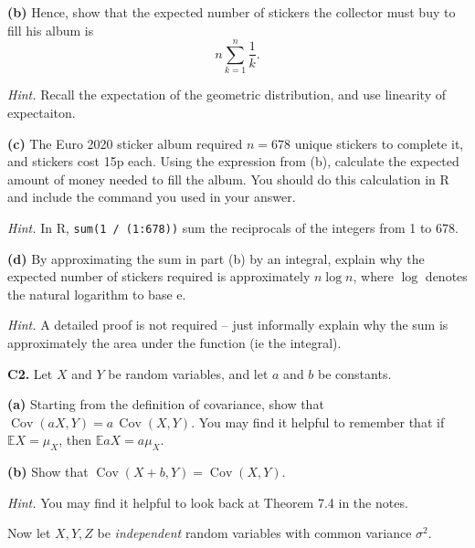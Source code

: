 \documentclass[
  a4paper,
]{book}
\theoremstyle{definition}
\theoremstyle{definition}
\theoremstyle{definition}
\theoremstyle{definition}
\theoremstyle{remark}
\begin{document}
\textbf{(b)} Hence, show that the expected number of stickers the collector must buy to fill his album is
\[ n \sum_{k=1}^n \frac{1}{k} . \]

\begin{myanswers}
\emph{Hint.} Recall the expectation of the geometric distribution, and use linearity of expectaiton.

\end{myanswers}

\textbf{(c)} The Euro 2020 sticker album required \(n = 678\) unique stickers to complete it, and stickers cost 15p each. Using the expression from (b), calculate the expected amount of money needed to fill the album. You should do this calculation in R and include the command you used in your answer.

\begin{myanswers}
\emph{Hint.} In R, \texttt{sum(1\ /\ (1:678))} sum the reciprocals of the integers from 1 to 678.

\end{myanswers}

\textbf{(d)} By approximating the sum in part (b) by an integral, explain why the expected number of stickers required is approximately \(n \log n\), where \(\log\) denotes the natural logarithm to base \(\mathrm e\).

\begin{myanswers}
\emph{Hint.} A detailed proof is not required -- just informally explain why the sum is approximately the area under the function (ie the integral).

\end{myanswers}

\textbf{C2.} Let \(X\) and \(Y\) be random variables, and let \(a\) and \(b\) be constants.

\textbf{(a)} Starting from the definition of covariance, show that \(\operatorname{Cov}(aX, Y) = a\,\operatorname{Cov}(X,Y)\). You may find it helpful to remember that if \(\mathbb EX = \mu_X\), then \(\mathbb EaX = a\mu_X\).

\textbf{(b)} Show that \(\operatorname{Cov}(X + b, Y) = \operatorname{Cov}(X, Y)\).

\begin{myanswers}
\emph{Hint.} You may find it helpful to look back at Theorem 7.4 in the notes.

\end{myanswers}

Now let \(X, Y, Z\) be \emph{independent} random variables with common variance \(\sigma^2\).
\end{document}
